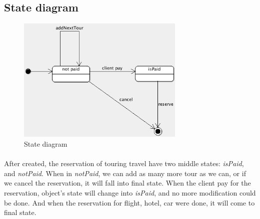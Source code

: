\subsection{State diagram}

\begin{figure}[h]
\centering
\includegraphics[width=8cm]{project/images/state.png}
\caption{State diagram}
\end{figure}

\paragraph{}
After created, the reservation of touring travel have two middle states: \textit{isPaid}, and \textit{notPaid}. When in \textit{notPaid}, we can add as many more tour as we can, or if we cancel the reservation, it will fall into final state. When the client pay for the reservation, object's state will change into \textit{isPaid}, and no more modification could be done. And when the reservation for flight, hotel, car were done, it will come to final state.